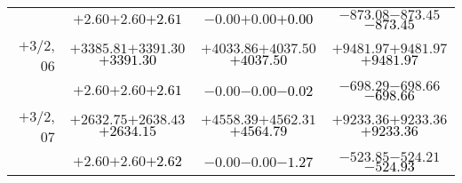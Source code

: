 \documentclass[compress]{beamer}
\begin{document}
\begin{frame}
{\begin{tabular}{r | c | c | c}
           & $+2.60$\hspace{0.1 cm}$+2.60$\hspace{0.1 cm}\textcolor{black}{$+2.61$} & $-0.00$\hspace{0.1 cm}$+0.00$\hspace{0.1 cm}\textcolor{black}{$+0.00$} & $-873.08$\hspace{0.1 cm}$-873.45$\hspace{0.1 cm}\textcolor{black}{$-873.45$} \\
$+$3/2, 06 & $+3385.81$\hspace{0.1 cm}$+3391.30$\hspace{0.1 cm}\textcolor{black}{$+3391.30$} & $+4033.86$\hspace{0.1 cm}$+4037.50$\hspace{0.1 cm}\textcolor{black}{$+4037.50$} & $+9481.97$\hspace{0.1 cm}$+9481.97$\hspace{0.1 cm}\textcolor{black}{$+9481.97$} \\
           & $+2.60$\hspace{0.1 cm}$+2.60$\hspace{0.1 cm}\textcolor{black}{$+2.61$} & $-0.00$\hspace{0.1 cm}$-0.00$\hspace{0.1 cm}\textcolor{black}{$-0.02$} & $-698.29$\hspace{0.1 cm}$-698.66$\hspace{0.1 cm}\textcolor{black}{$-698.66$} \\
$+$3/2, 07 & $+2632.75$\hspace{0.1 cm}$+2638.43$\hspace{0.1 cm}\textcolor{black}{$+2634.15$} & $+4558.39$\hspace{0.1 cm}$+4562.31$\hspace{0.1 cm}\textcolor{black}{$+4564.79$} & $+9233.36$\hspace{0.1 cm}$+9233.36$\hspace{0.1 cm}\textcolor{black}{$+9233.36$} \\
           & $+2.60$\hspace{0.1 cm}$+2.60$\hspace{0.1 cm}\textcolor{black}{$+2.62$} & $-0.00$\hspace{0.1 cm}$-0.00$\hspace{0.1 cm}\textcolor{black}{$-1.27$} & $-523.85$\hspace{0.1 cm}$-524.21$\hspace{0.1 cm}\textcolor{black}{$-524.93$} \\

\end{tabular}}
\end{frame}
\end{document}
